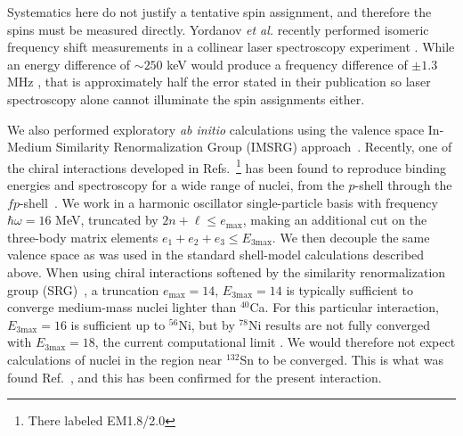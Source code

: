 \documentclass[twocolumn,prc,showpacs,preprintnumbers,amsmath,amssymb,superscriptaddress,nofootinbib,aps,10pt]{revtex4-1}
\begin{document}
Systematics here do not justify a tentative spin assignment, and therefore the spins must be measured directly. Yordanov \emph{et al.} recently performed isomeric frequency shift measurements in a collinear laser spectroscopy experiment \cite{Yordanov2013,Yordanov2016}. While an energy difference of $\sim 250$ keV would produce a frequency difference of $\pm 1.3$ MHz \cite{Yordanov2016a}, that is approximately half the error stated in their publication \cite{Yordanov2016} so laser spectroscopy alone cannot illuminate the spin assignments either.



We also performed exploratory {\it ab initio} calculations using the valence space In-Medium Similarity Renormalization Group (IMSRG) approach~\cite{Tsukiyama2012,Bogner2014,Stroberg2016,Stroberg2017}.
Recently, one of the chiral interactions developed in Refs.~\cite{Hebeler2011,Simonis2016}\footnote{There labeled EM1.8/2.0} has been found to reproduce binding energies and spectroscopy for a wide range of nuclei, from the $p$-shell through the $fp$-shell~\cite{Simonis2017}.
We work in a harmonic oscillator single-particle basis with frequency $\hbar\omega=16$ MeV, truncated by $2n+\ell \leq e_{\mathrm{max}}$, making an additional cut on the three-body matrix elements $e_1+e_2+e_3\leq E_{3\mathrm{max}}$.
We then decouple the same valence space as was used in the standard shell-model calculations described above.
When using chiral interactions softened by the similarity renormalization group (SRG)~\cite{Bogner2007,Roth2014b}, a truncation $e_{\mathrm{max}}=14$, $E_{3\mathrm{max}}=14$ is typically sufficient to converge medium-mass nuclei lighter than $^{40}$Ca.  For this particular interaction, $E_{3\mathrm{max}}=16$ is sufficient up to $^{56}$Ni, but by $^{78}$Ni results are not fully converged with $E_{3\mathrm{max}}=18$, the current computational limit \cite{Simonis2017}. We would therefore not expect calculations of nuclei in the region near $^{132}$Sn to be converged. This is what was found  Ref.~\cite{Binder2014}, and this has been confirmed for the present interaction.
\end{document}
